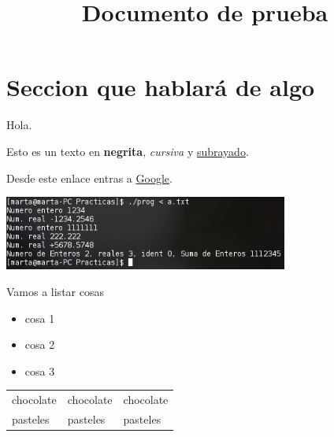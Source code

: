 \documentclass[10pt,a4paper]{article}
\title{Documento de prueba} %
\begin{document}
\section{Seccion que hablará de algo}
Hola.

Esto es un texto en \textbf{negrita}, \textit{cursiva} y \underline{subrayado}.

Desde este enlace entras a \href{www.google.com}{Google}.

\includegraphics[width=0.7\textwidth]{1}

Vamos a listar cosas
\begin{itemize}
\item cosa 1
\item cosa 2
\item cosa 3
\end{itemize}

\begin{tabular}{l|l|l}
\hline
chocolate & chocolate & chocolate \\
pasteles & pasteles & pasteles \\
\end{tabular}
\end{document}
